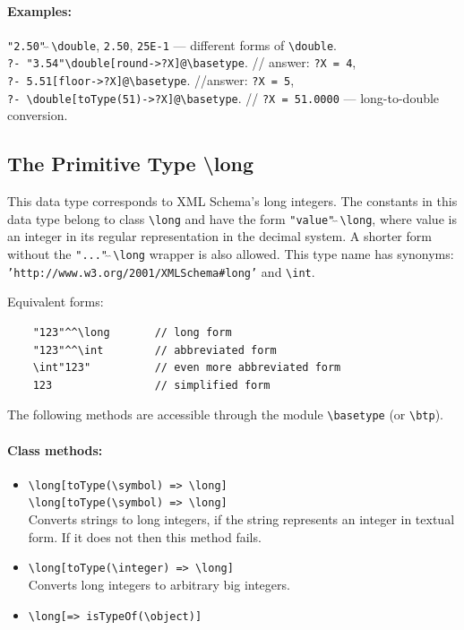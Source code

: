 \documentclass[11pt]{article}
\newcommand{\bs}{\textbackslash}
\begin{document}
\paragraph{Examples:}  {\tt "2.50"$\hat{~}\hat{~}$\bs{}double}, {\tt 2.50},
{\tt 25E-1} --- different forms of \texttt{\bs{}double}. \\
\texttt{?- "3.54"\bs{}double[round->?X]@\bs{}basetype}.  // answer: \texttt{?X = 4},
\\
\texttt{?- 5.51[floor->?X]@\bs{}basetype}.  //answer: \texttt{?X = 5},
\\
\texttt{?- \bs{}double[toType(51)->?X]@\bs{}basetype}.  // \texttt{?X = 51.0000} --- long-to-double conversion.


\subsection{ The Primitive Type \bs{}long}

\index{datatype!\bs{}long}
\index{class!\bs{}long}
This data type corresponds to XML Schema's long integers.
The constants in this data type belong to class {\tt \bs{}long} and have the
form {\tt "value"$\hat{~}\hat{~}$\bs{}long}, where value is an integer in its regular
representation in the decimal system. A shorter form without the
{\tt "..."$\hat{~}\hat{~}$\bs{}long}  wrapper is also allowed.
This type name has synonyms: {\tt 'http://www.w3.org/2001/XMLSchema\#long'}
and \verb|\int|.

\noindent
Equivalent forms:
\begin{verbatim}
    "123"^^\long       // long form
    "123"^^\int        // abbreviated form
    \int"123"          // even more abbreviated form
    123                // simplified form
\end{verbatim}


\noindent
The following methods are accessible through the module
\texttt{\bs{}basetype} (or \texttt{\bs{}btp}). 

\paragraph{Class methods:}
\begin{itemize}
    \item {\tt \bs{}long[toType(\bs{}symbol) => \bs{}long]}   \\
    {\tt \bs{}long[toType(\bs{}symbol) => \bs{}long]}   \\
      Converts strings to long integers, if the string represents an integer in textual form. If it does not then this method fails.
    \item {\tt \bs{}long[toType(\bs{}integer) => \bs{}long]}   \\
     Converts long integers to arbitrary big integers.
    \item {\tt \bs{}long[=> isTypeOf(\bs{}object)]}  
\end{itemize}
\end{document}
